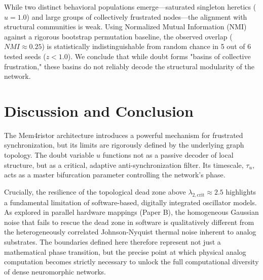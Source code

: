 \documentclass[11pt,a4paper]{article}
\begin{document}
While two distinct behavioral populations emerge---saturated singleton heretics ($u=1.0$) and large groups of collectively frustrated nodes---the alignment with structural communities is weak. Using Normalized Mutual Information (NMI) against a rigorous bootstrap permutation baseline, the observed overlap ($NMI \approx 0.25$) is statistically indistinguishable from random chance in 5 out of 6 tested seeds ($z < 1.0$). We conclude that while doubt forms "basins of collective frustration," these basins do not reliably decode the structural modularity of the network.

\section{Discussion and Conclusion}
\label{sec:discussion}
The Mem4ristor architecture introduces a powerful mechanism for frustrated synchronization, but its limits are rigorously defined by the underlying graph topology. The doubt variable $u$ functions not as a passive decoder of local structure, but as a critical, adaptive anti-synchronization filter. Its timescale, $\tau_u$, acts as a master bifurcation parameter controlling the network's phase.

Crucially, the resilience of the topological dead zone above $\lambda_{2,\mathrm{crit}} \approx 2.5$ highlights a fundamental limitation of software-based, digitally integrated oscillator models. As explored in parallel hardware mappings (Paper B), the homogeneous Gaussian noise that fails to rescue the dead zone in software is qualitatively different from the heterogeneously correlated Johnson-Nyquist thermal noise inherent to analog substrates. The boundaries defined here therefore represent not just a mathematical phase transition, but the precise point at which physical analog computation becomes strictly necessary to unlock the full computational diversity of dense neuromorphic networks.
\end{document}
